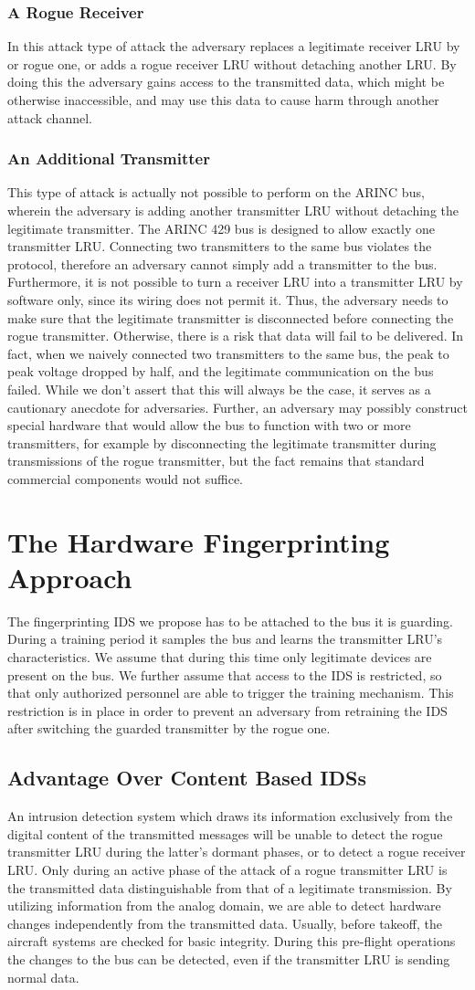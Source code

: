 \documentclass[compsoc,conference,a4paper]{IEEEtran}
\newcommand{\level}[1]{\section{#1}}
\newcommand{\sublevel}[1]{\subsection{#1}}
\newcommand{\subsublevel}[1]{\subsubsection{#1}}
\newcommand{\level}[1]{\chapter{#1}}
\newcommand{\sublevel}[1]{\section{#1}}
\newcommand{\subsublevel}[1]{\subsection{#1}}
\begin{document}
\subsublevel{A Rogue Receiver}
  In this attack type of attack the adversary replaces a legitimate receiver LRU by or rogue one, or adds a rogue receiver LRU without detaching another LRU. By doing this the adversary gains access to the transmitted data, which might be otherwise inaccessible, and may use this data to cause harm through another attack channel.

\subsublevel{An Additional Transmitter}
  This type of attack is actually not possible to perform on the ARINC bus, wherein the adversary is adding another transmitter LRU without detaching the legitimate transmitter. The ARINC 429 bus is designed to allow exactly one transmitter LRU. Connecting two transmitters to the same bus violates the protocol, therefore an adversary cannot simply add a transmitter to the bus. Furthermore, it is not possible to turn a receiver LRU into a transmitter LRU by software only, since its wiring does not permit it. Thus, the adversary needs to make sure that the legitimate transmitter is disconnected before connecting the rogue transmitter. Otherwise, there is a risk that data will fail to be delivered. In fact, when we naively connected two transmitters to the same bus, the peak to peak voltage dropped by half, and the legitimate communication on the bus failed. While we don't assert that this will always be the case, it serves as a cautionary anecdote for adversaries. Further, an adversary may possibly construct special hardware that would allow the bus to function with two or more transmitters, for example by disconnecting the legitimate transmitter during transmissions of the rogue transmitter, but the fact remains that standard commercial components would not suffice.

\level{The Hardware Fingerprinting Approach} \label{Approach}
  The fingerprinting IDS we propose has to be attached to the bus it is guarding. During a training period it samples the bus and learns the transmitter LRU's characteristics. We assume that during this time only legitimate devices are present on the bus. We further assume that access to the IDS is restricted, so that only authorized personnel are able to trigger the training mechanism. This restriction is in place in order to prevent an adversary from retraining the IDS after switching the guarded transmitter by the rogue one.
  
\sublevel{Advantage Over Content Based IDSs}
  An intrusion detection system which draws its information exclusively from the digital content of the transmitted messages will be unable to detect the rogue transmitter LRU during the latter's dormant phases, or to detect a rogue receiver LRU. Only during an active phase of the attack of a rogue transmitter LRU is the transmitted data distinguishable from that of a legitimate transmission. By utilizing information from the analog domain, we are able to detect hardware changes independently from the transmitted data.  Usually, before takeoff, the aircraft systems are checked for basic integrity. During this pre-flight operations the changes to the bus can be detected, even if the transmitter LRU is sending normal data.
  
\end{document}
